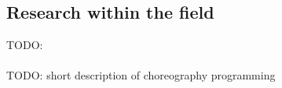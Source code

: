 \subsection{Research within the field}
TODO: \\ \\

TODO: short description of choreography programming

